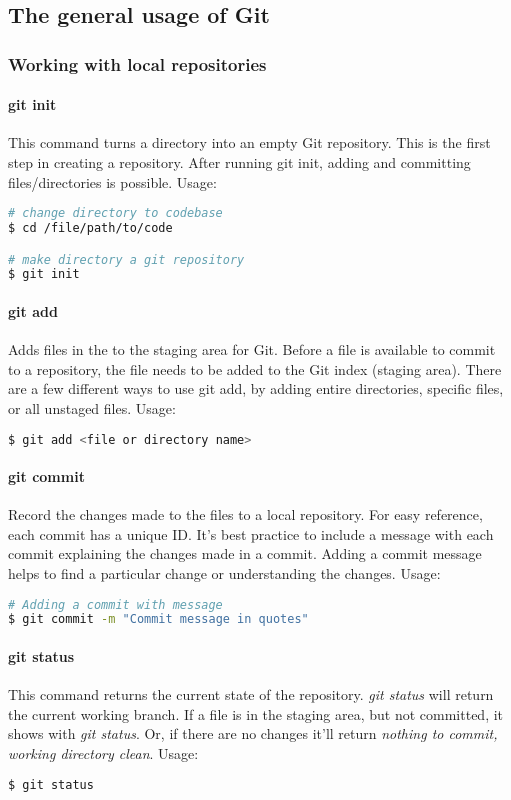 \documentclass[a4paper]{report}
\begin{document}
\subsection{The general usage of Git}
\subsubsection{Working with local repositories}
\paragraph{git init}
This command turns a directory into an empty Git repository. This is the first step in creating a repository. After running git init, adding and committing files/directories is possible.
Usage:
\lstset{numbers=right}

\begin{lstlisting}[language=bash]
# change directory to codebase
$ cd /file/path/to/code

# make directory a git repository
$ git init
\end{lstlisting}

\paragraph{git add}
Adds files in the to the staging area for Git. Before a file is available to commit to a repository, the file needs to be added to the Git index (staging area). There are a few different ways to use git add, by adding entire directories, specific files, or all unstaged files.
Usage:
\begin{lstlisting}[language=bash]
$ git add <file or directory name>
\end{lstlisting}
\paragraph{git commit}
Record the changes made to the files to a local repository. For easy reference, each commit has a unique ID.
It’s best practice to include a message with each commit explaining the changes made in a commit. Adding a commit message helps to find a particular change or understanding the changes.
Usage:
\begin{lstlisting}[language=bash]
# Adding a commit with message
$ git commit -m "Commit message in quotes"
\end{lstlisting}

\paragraph{git status}
This command returns the current state of the repository.
\emph{git status} will return the current working branch. If a file is in the staging area, but not committed, it shows with \emph{git status}. Or, if there are no changes it'll return \emph{nothing to commit, working directory clean}.
Usage:
\begin{lstlisting}[language=bash]
$ git status
\end{lstlisting}
\end{document}

